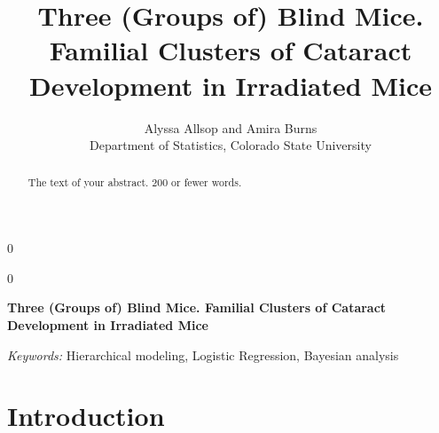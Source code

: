 \documentclass[12pt]{article}
\newcommand{\blind}{0}
\begin{document}
\def\spacingset#1{\renewcommand{\baselinestretch}%
{#1}\small\normalsize} \spacingset{1}



\blind
{
  \title{\bf Three (Groups of) Blind Mice. Familial Clusters of Cataract
Development in Irradiated Mice}

  \author{
        Alyssa Allsop and Amira Burns \\
    Department of Statistics, Colorado State University\\
      }
  \maketitle
} \fi

\blind
{
  \bigskip
  \bigskip
  \bigskip
  \begin{center}
    {\LARGE\bf Three (Groups of) Blind Mice. Familial Clusters of
Cataract Development in Irradiated Mice}
  \end{center}
  \medskip
} \fi

\bigskip
\begin{abstract}
The text of your abstract. 200 or fewer words.
\end{abstract}

\noindent%
{\it Keywords:} Hierarchical modeling, Logistic Regression, Bayesian
analysis
\vfill

\newpage
\spacingset{1.45} %

\section{Introduction}
\label{sec:intro}
\end{document}
